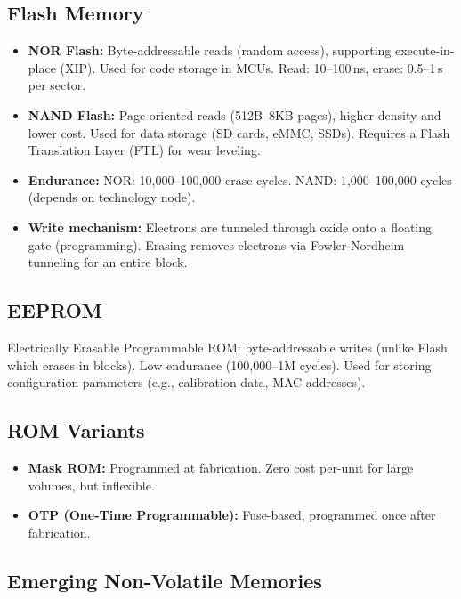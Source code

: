 \subsection{Flash Memory}

\begin{itemize}
  \item \textbf{NOR Flash:} Byte-addressable reads (random access), supporting execute-in-place (XIP). Used for code storage in MCUs. Read: 10--100\,ns, erase: 0.5--1\,s per sector.
  \item \textbf{NAND Flash:} Page-oriented reads (512B--8KB pages), higher density and lower cost. Used for data storage (SD cards, eMMC, SSDs). Requires a Flash Translation Layer (FTL) for wear leveling.
  \item \textbf{Endurance:} NOR: 10{,}000--100{,}000 erase cycles. NAND: 1{,}000--100{,}000 cycles (depends on technology node).
  \item \textbf{Write mechanism:} Electrons are tunneled through oxide onto a floating gate (programming). Erasing removes electrons via Fowler-Nordheim tunneling for an entire block.
\end{itemize}

\subsection{EEPROM}

Electrically Erasable Programmable ROM: byte-addressable writes (unlike Flash which erases in blocks). Low endurance (100{,}000--1M cycles). Used for storing configuration parameters (e.g., calibration data, MAC addresses).

\subsection{ROM Variants}

\begin{itemize}
  \item \textbf{Mask ROM:} Programmed at fabrication. Zero cost per-unit for large volumes, but inflexible.
  \item \textbf{OTP (One-Time Programmable):} Fuse-based, programmed once after fabrication.
\end{itemize}

\subsection{Emerging Non-Volatile Memories}

